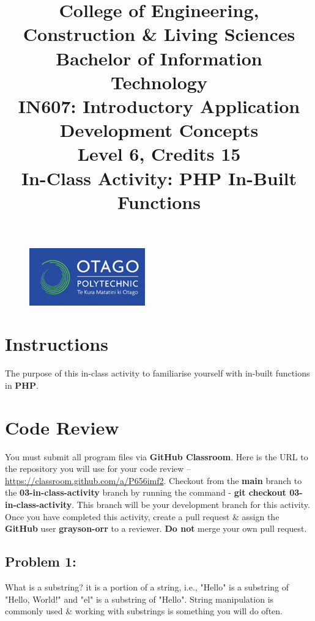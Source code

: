 \documentclass{article}
\author{}
\begin{document}
\begin{figure}
    \centering
    \includegraphics[width=50mm]{../img/logo.png}
\end{figure}

\title{College of Engineering, Construction \& Living Sciences\\Bachelor of Information Technology\\IN607: Introductory Application Development Concepts\\Level 6, Credits 15\\\textbf{In-Class Activity: PHP In-Built Functions}}
\date{}
\maketitle
 
\section*{Instructions}
The purpose of this in-class activity to familiarise yourself with in-built functions in \textbf{PHP}.

\section*{Code Review}
You must submit all program files via \textbf{GitHub Classroom}. Here is the URL to the repository you will use for your code review – \href{https://classroom.github.com/a/P656imf2}{https://classroom.github.com/a/P656imf2}. Checkout from the \textbf{main} branch to the \textbf{03-in-class-activity} branch by running the command - \textbf{git checkout 03-in-class-activity}. This branch will be your development branch for this activity. Once you have completed this activity, create a pull request \& assign the \textbf{GitHub} user \textbf{grayson-orr} to a reviewer. \textbf{Do not} merge your own pull request.

\subsection*{Problem 1:}
What is a substring? it is a portion of a string, i.e., "Hello" is a substring of "Hello, World!" and "el" is a substring of "Hello". String manipulation is commonly used \& working with substrings is something you will do often. \\
\end{document}
